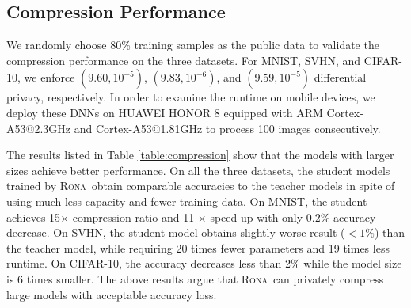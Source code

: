 \documentclass[letterpaper]{article} %
\newcommand*\system{\textsc{Rona}}
\begin{document}
\subsection{Compression Performance}
We randomly choose 80\% training samples as the public data to validate the compression performance on the three datasets. For MNIST, SVHN, and CIFAR-10, we enforce $(9.60,10^{-5})$, $(9.83,10^{-6})$, and $(9.59,10^{-5})$ differential privacy, respectively. In order to examine the runtime on mobile devices, we deploy these DNNs on HUAWEI HONOR 8 equipped with ARM Cortex-A53@2.3GHz and Cortex-A53@1.81GHz to process 100 images consecutively.

The results listed in Table \ref{table:compression} show that the models with larger sizes achieve better performance. On all the three datasets, the student models trained by \system\ obtain comparable accuracies to the teacher models in spite of using much less capacity and fewer training data. On MNIST, the student achieves 15$\times$ compression ratio and 11 $\times$ speed-up with only 0.2\% accuracy decrease. On SVHN, the student model obtains slightly worse result ($<1\%$) than the teacher model, while requiring 20 times fewer parameters and 19 times less runtime. On CIFAR-10, the accuracy decreases less than 2\% while the model size is 6 times smaller. The above results argue that \system\ can privately compress large models with acceptable accuracy loss.



\end{document}
